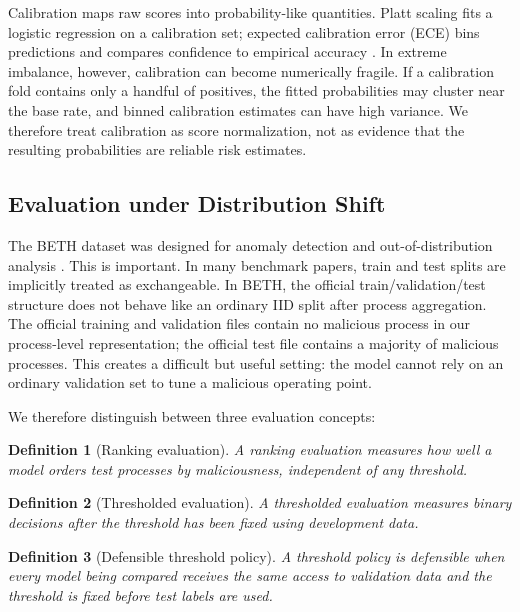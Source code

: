 \documentclass[journal]{IEEEtran}
\newtheorem{definition}{Definition}
\begin{document}
Calibration maps raw scores into probability-like quantities. Platt scaling \cite{platt1999} fits a logistic regression on a calibration set; expected calibration error (ECE) bins predictions and compares confidence to empirical accuracy \cite{guo2017}. In extreme imbalance, however, calibration can become numerically fragile. If a calibration fold contains only a handful of positives, the fitted probabilities may cluster near the base rate, and binned calibration estimates can have high variance. We therefore treat calibration as score normalization, not as evidence that the resulting probabilities are reliable risk estimates.

\subsection{Evaluation under Distribution Shift}

The BETH dataset was designed for anomaly detection and out-of-distribution analysis \cite{highnam2021}. This is important. In many benchmark papers, train and test splits are implicitly treated as exchangeable. In BETH, the official train/validation/test structure does not behave like an ordinary IID split after process aggregation. The official training and validation files contain no malicious process in our process-level representation; the official test file contains a majority of malicious processes. This creates a difficult but useful setting: the model cannot rely on an ordinary validation set to tune a malicious operating point.

We therefore distinguish between three evaluation concepts:
\begin{definition}[Ranking evaluation]
A ranking evaluation measures how well a model orders test processes by maliciousness, independent of any threshold.
\end{definition}

\begin{definition}[Thresholded evaluation]
A thresholded evaluation measures binary decisions after the threshold has been fixed using development data.
\end{definition}

\begin{definition}[Defensible threshold policy]
A threshold policy is defensible when every model being compared receives the same access to validation data and the threshold is fixed before test labels are used.
\end{definition}
\end{document}
